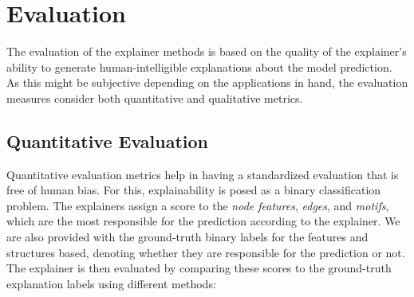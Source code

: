 
\section{Evaluation}
\label{sec::eval}
The evaluation of the explainer methods is based on the quality of the explainer's ability to generate human-intelligible explanations about the model prediction. As this might be subjective depending on the applications in hand, the evaluation measures consider both quantitative and qualitative metrics.


\subsection{Quantitative Evaluation}
Quantitative evaluation metrics help in having a standardized evaluation that is free of human bias. 
For this, explainability is posed as a binary classification problem. The explainers assign a score to the \textit{node features}, \textit{edges}, and \textit{motifs}, which are the most responsible for the prediction according to the explainer. We are also provided with the ground-truth binary labels for the features and structures based, denoting whether they are responsible for the prediction or not. The explainer is then evaluated by comparing these scores to the ground-truth explanation labels using different methods: 



